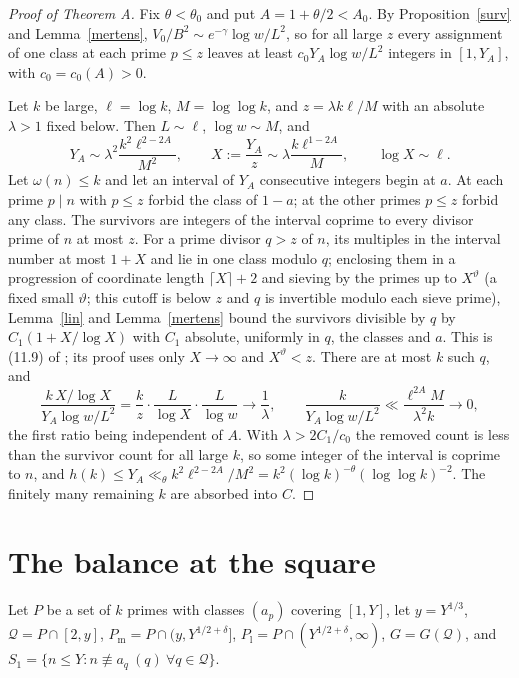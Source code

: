 \documentclass[11pt]{amsart}
\begin{document}
\begin{proof}[Proof of Theorem A]
Fix $\theta<\theta_0$ and put $A=1+\theta/2<A_0$. By Proposition~\ref{surv} and Lemma~\ref{mertens}, $V_0/B^2\sim e^{-\gamma}\log w/L^2$, so for all large $z$ every assignment of one class at each prime $p\le z$ leaves at least $c_0Y_A\log w/L^2$ integers in $[1,Y_A]$, with $c_0=c_0(A)>0$.

Let $k$ be large, $\ell=\log k$, $M=\log\log k$, and $z=\lambda k\ell/M$ with an absolute $\lambda>1$ fixed below. Then $L\sim\ell$, $\log w\sim M$, and
\[
Y_A\sim\lambda^2\frac{k^2\ell^{2-2A}}{M^2},\qquad X:=\frac{Y_A}{z}\sim\lambda\frac{k\ell^{1-2A}}{M},\qquad\log X\sim\ell .
\]
Let $\omega(n)\le k$ and let an interval of $Y_A$ consecutive integers begin at $a$. At each prime $p\mid n$ with $p\le z$ forbid the class of $1-a$; at the other primes $p\le z$ forbid any class. The survivors are integers of the interval coprime to every divisor prime of $n$ at most $z$. For a prime divisor $q>z$ of $n$, its multiples in the interval number at most $1+X$ and lie in one class modulo $q$; enclosing them in a progression of coordinate length $\lceil X\rceil+2$ and sieving by the primes up to $X^{\vartheta}$ (a fixed small $\vartheta$; this cutoff is below $z$ and $q$ is invertible modulo each sieve prime), Lemma~\ref{lin} and Lemma~\ref{mertens} bound the survivors divisible by $q$ by $C_1(1+X/\log X)$ with $C_1$ absolute, uniformly in $q$, the classes and $a$. This is (11.9) of \cite{OAI}; its proof uses only $X\to\infty$ and $X^\vartheta<z$. There are at most $k$ such $q$, and
\[
\frac{k\,X/\log X}{Y_A\log w/L^2}=\frac{k}{z}\cdot\frac{L}{\log X}\cdot\frac{L}{\log w}\longrightarrow\frac1\lambda,\qquad
\frac{k}{Y_A\log w/L^2}\ll\frac{\ell^{2A}M}{\lambda^2k}\longrightarrow0,
\]
the first ratio being independent of $A$. With $\lambda>2C_1/c_0$ the removed count is less than the survivor count for all large $k$, so some integer of the interval is coprime to $n$, and $h(k)\le Y_A\ll_\theta k^2\ell^{2-2A}/M^2=k^2(\log k)^{-\theta}(\log\log k)^{-2}$. The finitely many remaining $k$ are absorbed into $C$.
\end{proof}

\section{The balance at the square}\label{sec:budget}

Let $P$ be a set of $k$ primes with classes $(a_p)$ covering $[1,Y]$, let $y=Y^{1/3}$, $\mathcal Q=P\cap[2,y]$, $P_{\mathrm m}=P\cap(y,Y^{1/2+\delta}]$, $P_{\mathrm l}=P\cap(Y^{1/2+\delta},\infty)$, $G=G(\mathcal Q)$, and $S_1=\{n\le Y:n\not\equiv a_q\ (q)\ \forall q\in\mathcal Q\}$.
\end{document}
